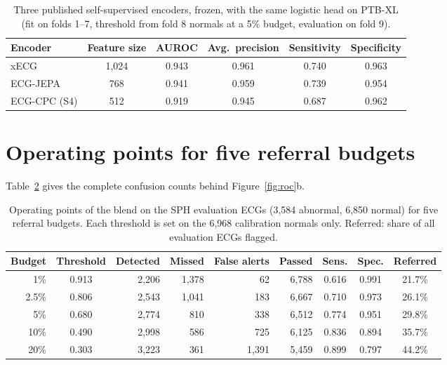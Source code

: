\documentclass[letterpaper,11pt]{article}
\begin{document}
\begin{table}[H]
  \centering
  \caption{Three published self-supervised encoders, frozen, with the same logistic head on PTB-XL (fit on folds 1--7, threshold from fold 8 normals at a 5\% budget, evaluation on fold 9).}
  \label{tab:encoders}
  \begin{tabular}{lccccc}
    \toprule
    Encoder & Feature size & AUROC & Avg.\ precision & Sensitivity & Specificity \\
    \midrule
    xECG       & 1,024 & 0.943 & 0.961 & 0.740 & 0.963 \\
    ECG-JEPA   &   768 & 0.941 & 0.959 & 0.739 & 0.954 \\
    ECG-CPC (S4) & 512 & 0.919 & 0.945 & 0.687 & 0.962 \\
    \bottomrule
  \end{tabular}
\end{table}

\section{Operating points for five referral budgets}
\label{app:budgets}

Table~\ref{tab:budgets} gives the complete confusion counts behind Figure~\ref{fig:roc}b.

\begin{table}[H]
  \centering
  \caption{Operating points of the blend on the SPH evaluation ECGs (3,584 abnormal, 6,850 normal) for five referral budgets. Each threshold is set on the 6,968 calibration normals only. Referred: share of all evaluation ECGs flagged.}
  \label{tab:budgets}
  \begin{tabular}{rcrrrrccc}
    \toprule
    Budget & Threshold & Detected & Missed & False alerts & Passed & Sens. & Spec. & Referred \\
    \midrule
    1\%   & 0.913 & 2,206 & 1,378 &    62 & 6,788 & 0.616 & 0.991 & 21.7\% \\
    2.5\% & 0.806 & 2,543 & 1,041 &   183 & 6,667 & 0.710 & 0.973 & 26.1\% \\
    5\%   & 0.680 & 2,774 &   810 &   338 & 6,512 & 0.774 & 0.951 & 29.8\% \\
    10\%  & 0.490 & 2,998 &   586 &   725 & 6,125 & 0.836 & 0.894 & 35.7\% \\
    20\%  & 0.303 & 3,223 &   361 & 1,391 & 5,459 & 0.899 & 0.797 & 44.2\% \\
    \bottomrule
  \end{tabular}
\end{table}
\end{document}
